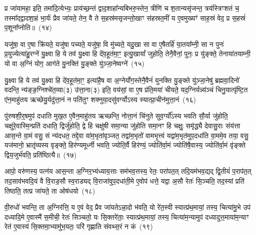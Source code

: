 प्र जा॑यामहा॒ इति॒ तमा॑दि॒त्येभ्यः॒ प्राय॑च्छ॒न्तं द्वाद॒शाहा᳚न्यबिभरु॒स्तेन॒ त्रीणि॑ च श॒तान्यसृ॑जन्त॒ त्रय॑स्त्रिꣳशतं च॒ तस्मा᳚द्\-द्वादशा॒हं भा॒र्यः॑ प्रैव जा॑यते॒ तेन॒ वै ते स॒हस्र॑मसृजन्तो॒खाꣳ स॑हस्रत॒मीं य ए॒वमुख्यꣳ॑ साह॒स्रं वेद॒ प्र स॒हस्रं॑ प॒शूना᳚प्नोति॥~(१४)\ip

{\anuvakamend[{अ॒ग्नि॒वान्प॑शु॒मान॑सा॒नीति॒ वा अ॒ग्निर्ध॑विष्ये मृशेत्प्र॒जा\-प॑तिस्त्वा सादयतु॒ तया॑ दे॒वत॑या\-ऽ\-ङ्गिर॒स्वद्ध्रु॒वा सी॑द॒ तेन॒ ताना॑दि॒त्या अ॑ब्रुव॒न्प्र यू॒यम॑जनिढ्वं व॒यञ्च॑त्वारि॒ꣳ॒शच्च॑}]}

यजु॑षा॒ वा ए॒षा क्रि॑यते॒ यजु॑षा पच्यते॒ यजु॑षा॒ वि मु॑च्यते॒ यदु॒खा सा वा ए॒षैतर्\mbox{}हि॑ या॒तया᳚म्नी॒ सा न पुनः॑ प्र॒युज्येत्या॑हु॒रग्ने॑ यु॒क्ष्वा हि ये तव॑ यु॒क्ष्वा हि दे॑व॒हूत॑मा॒ꣳ॒ इत्यु॒खायां᳚ जुहोति॒ तेनै॒वैनां॒ पुनः॒ प्र यु॑ङ्क्ते॒ तेनाया॑तयाम्नी॒ यो वा अ॒ग्निं योग॒ आग॑ते यु॒नक्ति॑ यु॒ङ्क्ते यु॑ञ्जा॒नेष्वग्ने॑~(१५)\ip

यु॒क्ष्वा हि ये तव॑ यु॒क्ष्वा हि दे॑व॒हूत॑मा॒ꣳ॒ इत्या॑है॒ष वा अ॒ग्नेर्योग॒स्तेनै॒वैनं॑ युनक्ति यु॒ङ्क्ते यु॑ञ्जा॒नेषु॑ ब्रह्मवा॒दिनो॑ वदन्ति॒ न्य॑ङ्ङ॒ग्निश्चे॑त॒व्या(३) उ॑त्ता॒ना(३) इति॒ वय॑सां॒ वा ए॒ष प्र॑ति॒मया॑ चीयते॒ यद॒ग्निर्यन्न्य॑ञ्चं चिनु॒यात्पृ॑ष्टि॒त ए॑न॒माहु॑तय ऋच्छेयु॒र्यदु॑त्ता॒नं न पति॑तुꣳ शक्नुया॒दसु॑वर्ग्यो\-ऽस्य स्यात्प्रा॒चीन॑मुत्ता॒नं~(१६)\ip

पु॑रुषशी॒र्॒\mbox{}षमुप॑ दधाति मुख॒त ए॒वैन॒माहु॑तय ऋच्छन्ति॒ नोत्ता॒नं चि॑नुते सुव॒र्ग्यो᳚\-ऽस्य भवति सौ॒र्या जु॑होति॒ चक्षु॑रे॒वास्मि॒न्प्रति॑ दधाति॒ द्विर्जु॑होति॒ द्वे हि चक्षु॑षी समा॒न्या जु॑होति समा॒नꣳ हि चक्षुः॒ समृ॑द्ध्यै देवासु॒राः संय॑त्ता आस॒न्ते वा॒मं वसु॒ सं न्य॑दधत॒ तद्दे॒वा वा॑म॒भृता॑वृञ्जत॒ तद्वा॑म॒भृतो॑ वामभृ॒त्त्वं यद्वा॑म॒भृत॑मुप॒\-दधा॑ति वा॒ममे॒व तया॒ वसु॒ यज॑मानो॒ भ्रातृ॑व्यस्य वृङ्क्ते॒ हिर॑ण्यमूर्ध्नी भवति॒ ज्योति॒र्वै हिर॑ण्यं॒ ज्योति॑र्वा॒मं ज्योति॑षै॒वास्य॒ ज्योति॑र्वा॒मं वृ॑ङ्क्ते द्विय॒जुर्भ॑वति॒ प्रति॑ष्ठित्यै॥~(१७)\ip

{\anuvakamend[{यु॒ञ्जा॒नेष्वग्ने᳚ प्रा॒चीन॑मुत्ता॒नं वा॑म॒भृत॒ञ्चतु॑र्विꣳशतिश्च}]}

आपो॒ वरु॑णस्य॒ पत्न॑य आस॒न्ता अ॒ग्निर॒भ्य॑ध्याय॒त्ताः सम॑भव॒त्तस्य॒ रेतः॒ परा॑पत॒त् तदि॒यम॑भव॒द्यद् द्वि॒तीयं॑ प॒राप॑त॒त् तद॒सा\-व॑भवदि॒यं वै वि॒राड॒सौ स्व॒राड्यद् वि॒राजा॑वुप॒\-दधा॑ती॒मे ए॒वोप॑ धत्ते॒ यद्वा अ॒सौ रेतः॑ सि॒ञ्चति॒ तद॒स्यां प्रति॑ तिष्ठति॒ तत्प्र जा॑यते॒ ता ओष॑धयो~(१८)\ip

वी॒रुधो॑ भवन्ति॒ ता अ॒ग्निर॑त्ति॒ य ए॒वं वेद॒ प्रैव जा॑यते\-ऽन्ना॒दो भ॑वति॒ यो रे॑त॒स्वी स्यात्प्र॑थ॒मायां॒ तस्य॒ चित्या॑मु॒भे उप॑ दध्यादि॒मे ए॒वास्मै॑ स॒मीची॒ रेतः॑ सिञ्चतो॒ यः सि॒क्तरे॑ताः॒ स्यात्प्र॑थ॒मायां॒ तस्य॒ चित्या॑म॒न्यामुप॑ दध्यादुत्त॒माया॑\-म॒न्याꣳ रेत॑ ए॒वास्य॑ सि॒क्तमा॒भ्यामु॑भ॒यतः॒ परि॑ गृह्णाति संवथ्स॒रं न कं~(१९)\ip


